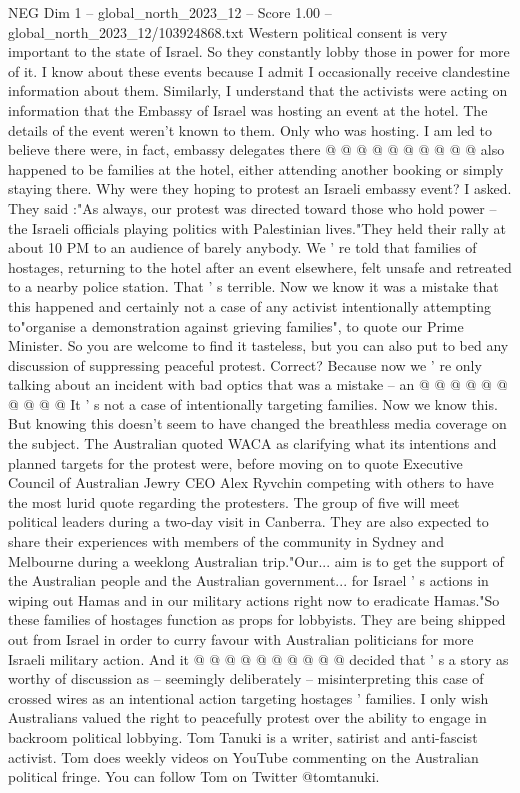 \begin{textsample}{NEG Dim 1 – global\_north\_2023\_12 – Score 1.00 – global\_north\_2023\_12/103924868.txt}
Western political consent is very important to the state of Israel.
So they constantly lobby those in power for more of it.
I know about these events because I admit I occasionally receive clandestine information about them.
Similarly, I understand that the activists were acting on information that the Embassy of Israel was hosting an event at the hotel.
The details of the event weren't known to them.
Only who was hosting.
I am led to believe there were, in fact, embassy delegates there @ @ @ @ @ @ @ @ @ @ also happened to be families at the hotel, either attending another booking or simply staying there.
Why were they hoping to protest an Israeli embassy event?
I asked.
They said :"As always, our protest was directed toward those who hold power -- the Israeli officials playing politics with Palestinian lives."They held their rally at about 10 PM to an audience of barely anybody.
We ' re told that families of hostages, returning to the hotel after an event elsewhere, felt unsafe and retreated to a nearby police station.
That ' s terrible.
Now we know it was a mistake that this happened and certainly not a case of any activist intentionally attempting to"organise a demonstration against grieving families", to quote our Prime Minister.
So you are welcome to find it tasteless, but you can also put to bed any discussion of suppressing peaceful protest.
Correct?
Because now we ' re only talking about an incident with bad optics that was a mistake -- an @ @ @ @ @ @ @ @ @ @ It ' s not a case of intentionally targeting families.
Now we know this.
But knowing this doesn't seem to have changed the breathless media coverage on the subject.
The Australian quoted WACA as clarifying what its intentions and planned targets for the protest were, before moving on to quote Executive Council of Australian Jewry CEO Alex Ryvchin competing with others to have the most lurid quote regarding the protesters.
The group of five will meet political leaders during a two-day visit in Canberra.
They are also expected to share their experiences with members of the community in Sydney and Melbourne during a weeklong Australian trip."Our... aim is to get the support of the Australian people and the Australian government... for Israel ' s actions in wiping out Hamas and in our military actions right now to eradicate Hamas."So these families of hostages function as props for lobbyists.
They are being shipped out from Israel in order to curry favour with Australian politicians for more Israeli military action.
And it @ @ @ @ @ @ @ @ @ @ decided that ' s a story as worthy of discussion as -- seemingly deliberately -- misinterpreting this case of crossed wires as an intentional action targeting hostages ' families.
I only wish Australians valued the right to peacefully protest over the ability to engage in backroom political lobbying.
Tom Tanuki is a writer, satirist and anti-fascist activist.
Tom does weekly videos on YouTube commenting on the Australian political fringe.
You can follow Tom on Twitter @tomtanuki.

\end{textsample}
